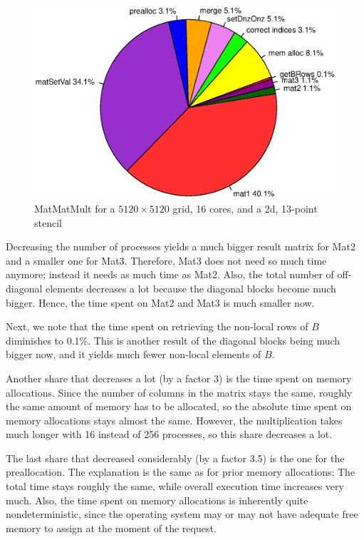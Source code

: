 \begin{figure}[tbp]
	\centering
	\includegraphics[width=1\textwidth, trim={0 3.5cm 0 3cm},clip]{16cores_5120}
	\caption{MatMatMult for a $5120 \times 5120$ grid, 16 cores, and a 2d, 13-point stencil} 
	\label{fig:pie_16_5120}
\end{figure}

Decreasing the number of processes yields a much bigger result matrix for Mat2 and a smaller one for Mat3. Therefore, Mat3 does not need so much time anymore; instead it needs as much time as Mat2. Also, the total number of off-diagonal elements decreases a lot because the diagonal blocks become much bigger. Hence, the time spent on Mat2 and Mat3 is much smaller now.

Next, we note that the time spent on retrieving the non-local rows of $B$ diminishes to 0.1\%. This is another result of the diagonal blocks being much bigger now, and it yields much fewer non-local elements of $B$.

Another share that decreases a lot (by a factor 3) is the time spent on memory allocations. Since the number of columns in the matrix stays the same, roughly the same amount of memory has to be allocated, so the absolute time spent on memory allocations stays almost the same. However, the multiplication takes much longer with 16 instead of 256 processes, so this share decreases a lot. 

The last share that decreased considerably (by a factor 3.5) is the one for the preallocation. The explanation is the same as for prior memory allocations: The total time stays roughly the same, while overall execution time increases very much. Also, the time spent on memory allocations is inherently quite nondeterministic, since the operating system may or may not have adequate free memory to assign at the moment of the request.

